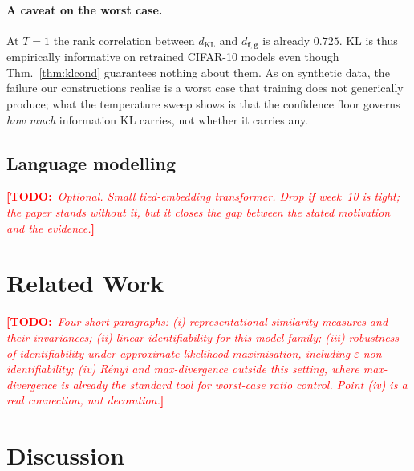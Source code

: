 \documentclass[10pt,letterpaper,twocolumn]{article}
\newcommand{\TODO}[1]{\textcolor{red}{\small\textbf{[TODO:}~\textit{#1}\textbf{]}}}
\newcommand{\bff}{\mathbf{f}}
\newcommand{\bfg}{\mathbf{g}}
\newcommand{\dKL}{d_{\mathrm{KL}}}
\newcommand{\dfg}{d_{\bff,\bfg}}
\theoremstyle{plain}
\theoremstyle{definition}
\theoremstyle{remark}
\begin{document}
\paragraph{A caveat on the worst case.}
At $T=1$ the rank correlation between $\dKL$ and $\dfg$ is already $0.725$.
KL is thus empirically informative on retrained CIFAR-10 models even though
Thm.~\ref{thm:klcond} guarantees nothing about them. As on synthetic data, the failure our constructions realise is a worst
case that training does not generically produce; what the temperature sweep
shows is that the confidence floor governs \emph{how much} information KL
carries, not whether it carries any.

\subsection{Language modelling}
\TODO{Optional. Small tied-embedding transformer. Drop if week~10 is tight; the
paper stands without it, but it closes the gap between the stated motivation and
the evidence.}

\section{Related Work}
\TODO{Four short paragraphs: (i) representational similarity measures and their
invariances; (ii) linear identifiability for this model family; (iii)
robustness of identifiability under approximate likelihood maximisation,
including $\varepsilon$-non-identifiability; (iv) R\'enyi and max-divergence
outside this setting, where max-divergence is already the standard tool for
worst-case ratio control. Point (iv) is a real connection, not decoration.}

\section{Discussion}
\label{sec:discussion}
\end{document}
